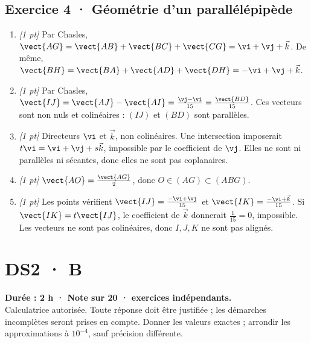 \subsection*{Exercice 4 · Géométrie d'un parallélépipède}\begin{enumerate}

\item \textit{[1 pt]} Par Chasles, $\vect{AG}=\vect{AB}+\vect{BC}+\vect{CG}=\vi +\vj +\vec k$. De même, $\vect{BH}=\vect{BA}+\vect{AD}+\vect{DH}=-\vi +\vj +\vec k$.

\item \textit{[1 pt]} Par Chasles, $\vect{IJ}=\vect{AJ}-\vect{AI}=\frac{\vj -\vi }{15}=\frac{\vect{BD}}{15}$. Ces vecteurs sont non nuls et colinéaires : $(IJ)$ et $(BD)$ sont parallèles.

\item \textit{[1 pt]} Directeurs $\vi $ et $\vec k$, non colinéaires. Une intersection imposerait $t\vi =\vi +\vj +s\vec k$, impossible par le coefficient de $\vj $. Elles ne sont ni parallèles ni sécantes, donc elles ne sont pas coplanaires.

\item \textit{[1 pt]} $\vect{AO}=\frac{\vect{AG}}{2}$, donc $O\in(AG)\subset(ABG)$.

\item \textit{[1 pt]} Les points vérifient $\vect{IJ}=\frac{-\vi +\vj }{15}$ et $\vect{IK}=\frac{-\vi +\vec k}{15}$. Si $\vect{IK}=t\vect{IJ}$, le coefficient de $\vec k$ donnerait $\frac{1}{15}=0$, impossible. Les vecteurs ne sont pas colinéaires, donc $I,J,K$ ne sont pas alignés.

\end{enumerate}

\fi

\fi

\ifmxteacher

\mxnewpage{}\label{sujet:2-4}

\section*{DS2 · B}


\textbf{Durée : 2 h · Note sur 20 ·  exercices indépendants.}\\Calculatrice autorisée. Toute réponse doit être justifiée ; les démarches incomplètes seront prises en compte. Donner les valeurs exactes ; arrondir les approximations à $10^{-4}$, sauf précision différente.

